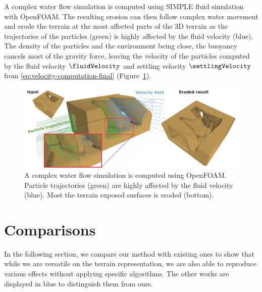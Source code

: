 A complex water flow simulation is computed using SIMPLE \cite{Caretto1973} fluid simulation with OpenFOAM. The resulting erosion can then follow complex water movement and erode the terrain at the most affected parts of the 3D terrain as the trajectories of the particles (green) is highly affected by the fluid velocity (blue). The density of the particles and the environment being close, the buoyancy cancels most of the gravity force, leaving the velocity of the particles computed by the fluid velocity $\fluidVelocity$ and settling velocity $\settlingVelocity$ from \eqref{eq:velocity-computation-final} (Figure~\ref{fig:erosion_underwater_result}).
\begin{figure}[t]
    
    \centering
    \includegraphics{Results/flowfield.pdf}
    \caption{A complex water flow simulation is computed using OpenFOAM. Particle trajectories (green) are highly affected by the fluid velocity (blue). Most the terrain exposed surfaces is eroded (bottom). }
    \label{fig:erosion_underwater_result}
\end{figure}
\section{Comparisons}
In the following section, we compare our method with existing ones to show that while we are versatile on the terrain representation, we are also able to reproduce various effects without applying specific algorithms. The other works are displayed in blue to distinguish them from ours.

